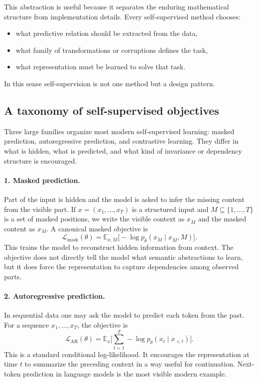 This abstraction is useful because it separates the enduring mathematical structure from implementation details.
Every self-supervised method chooses:
\begin{itemize}
    \item what predictive relation should be extracted from the data,
    \item what family of transformations or corruptions defines the task,
    \item what representation must be learned to solve that task.
\end{itemize}
In this sense self-supervision is not one method but a design pattern.

\subsection*{A taxonomy of self-supervised objectives}

Three large families organize most modern self-supervised learning: masked prediction, autoregressive prediction, and contrastive learning.
They differ in what is hidden, what is predicted, and what kind of invariance or dependency structure is encouraged.

\paragraph{1. Masked prediction.}
Part of the input is hidden and the model is asked to infer the missing content from the visible part.
If $x = (x_1,\dots,x_T)$ is a structured input and $M \subseteq \{1,\dots,T\}$ is a set of masked positions, we write the visible context as $x_{\bar M}$ and the masked content as $x_M$.
A canonical masked objective is
\[
\mathcal{L}_{\mathrm{mask}}(\theta)
=
\mathbb{E}_{x,M}
\big[
-\log p_\theta(x_M \mid x_{\bar M}, M)
\big].
\]
This trains the model to reconstruct hidden information from context.
The objective does not directly tell the model what semantic abstractions to learn, but it does force the representation to capture dependencies among observed parts.

\paragraph{2. Autoregressive prediction.}
In sequential data one may ask the model to predict each token from the past.
For a sequence $x_1,\dots,x_T$, the objective is
\[
\mathcal{L}_{\mathrm{AR}}(\theta)
=
\mathbb{E}_{x}
\Big[
\sum_{t=1}^{T}
-\log p_\theta(x_t \mid x_{<t})
\Big].
\]
This is a standard conditional log-likelihood.
It encourages the representation at time $t$ to summarize the preceding context in a way useful for continuation.
Next-token prediction in language models is the most visible modern example.

